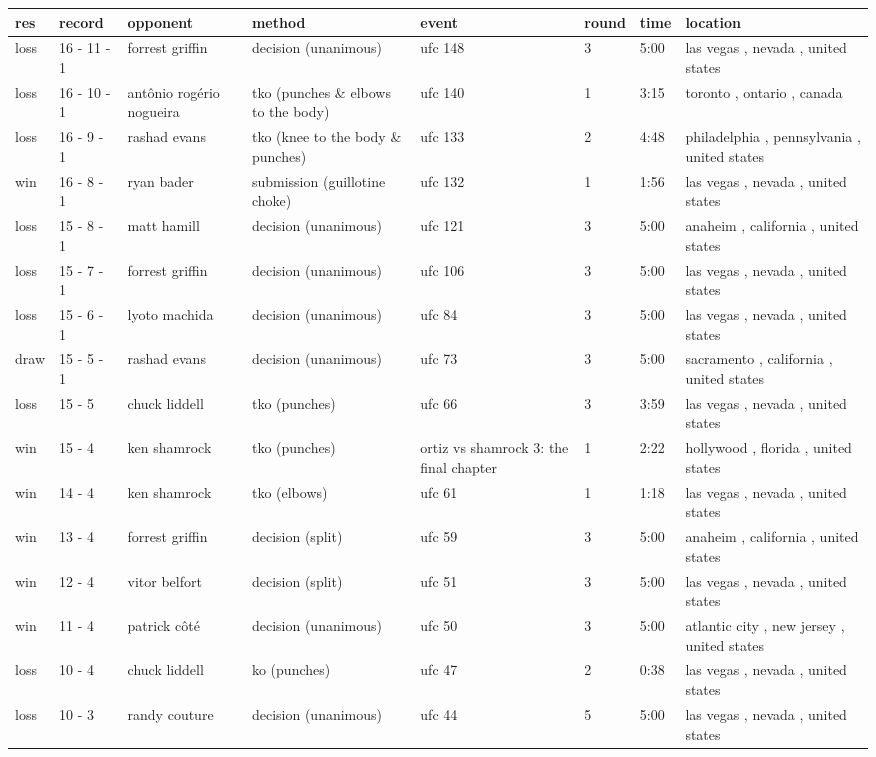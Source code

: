 \documentclass{article}
\begin{document}
\begin{tabular}{llllllll}
\toprule
res & record & opponent & method & event & round & time & location \\
\midrule
loss & 16 - 11 - 1 & forrest griffin & decision (unanimous) & ufc 148 & 3 & 5:00 & las vegas , nevada , united states \\
loss & 16 - 10 - 1 & antônio rogério nogueira & tko (punches \& elbows to the body) & ufc 140 & 1 & 3:15 & toronto , ontario , canada \\
loss & 16 - 9 - 1 & rashad evans & tko (knee to the body \& punches) & ufc 133 & 2 & 4:48 & philadelphia , pennsylvania , united states \\
win & 16 - 8 - 1 & ryan bader & submission (guillotine choke) & ufc 132 & 1 & 1:56 & las vegas , nevada , united states \\
loss & 15 - 8 - 1 & matt hamill & decision (unanimous) & ufc 121 & 3 & 5:00 & anaheim , california , united states \\
loss & 15 - 7 - 1 & forrest griffin & decision (unanimous) & ufc 106 & 3 & 5:00 & las vegas , nevada , united states \\
loss & 15 - 6 - 1 & lyoto machida & decision (unanimous) & ufc 84 & 3 & 5:00 & las vegas , nevada , united states \\
draw & 15 - 5 - 1 & rashad evans & decision (unanimous) & ufc 73 & 3 & 5:00 & sacramento , california , united states \\
loss & 15 - 5 & chuck liddell & tko (punches) & ufc 66 & 3 & 3:59 & las vegas , nevada , united states \\
win & 15 - 4 & ken shamrock & tko (punches) & ortiz vs shamrock 3: the final chapter & 1 & 2:22 & hollywood , florida , united states \\
win & 14 - 4 & ken shamrock & tko (elbows) & ufc 61 & 1 & 1:18 & las vegas , nevada , united states \\
win & 13 - 4 & forrest griffin & decision (split) & ufc 59 & 3 & 5:00 & anaheim , california , united states \\
win & 12 - 4 & vitor belfort & decision (split) & ufc 51 & 3 & 5:00 & las vegas , nevada , united states \\
win & 11 - 4 & patrick côté & decision (unanimous) & ufc 50 & 3 & 5:00 & atlantic city , new jersey , united states \\
loss & 10 - 4 & chuck liddell & ko (punches) & ufc 47 & 2 & 0:38 & las vegas , nevada , united states \\
loss & 10 - 3 & randy couture & decision (unanimous) & ufc 44 & 5 & 5:00 & las vegas , nevada , united states \\

\end{tabular}
\end{document}
